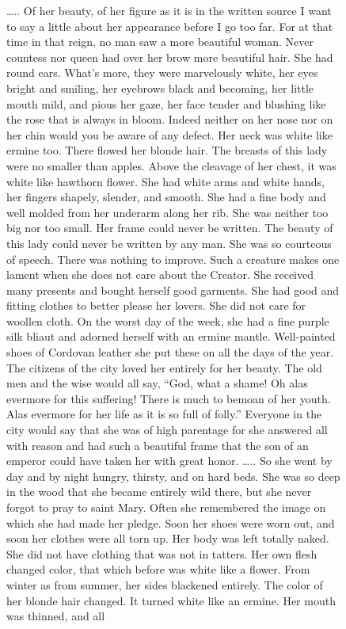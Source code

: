 \documentclass[
  letterpaper,
  DIV=11,
  numbers=noendperiod,
  oneside]{scrreprt}
\begin{document}
\begin{figure}
\ldots.. Of her beauty, of her figure as it is in the written source I
want to say a little about her appearance before I go too far. For at
that time in that reign, no man saw a more beautiful woman. Never
countess nor queen had over her brow more beautiful hair. She had round
ears. What's more, they were marvelously white, her eyes bright and
smiling, her eyebrows black and becoming, her little mouth mild, and
pious her gaze, her face tender and blushing like the rose that is
always in bloom. Indeed neither on her nose nor on her chin would you be
aware of any defect. Her neck was white like ermine too. There flowed
her blonde hair. The breasts of this lady were no smaller than apples.
Above the cleavage of her chest, it was white like hawthorn flower. She
had white arms and white hands, her fingers shapely, slender, and
smooth. She had a fine body and well molded from her underarm along her
rib. She was neither too big nor too small. Her frame could never be
written. The beauty of this lady could never be written by any man. She
was so courteous of speech. There was nothing to improve. Such a
creature makes one lament when she does not care about the Creator. She
received many presents and bought herself good garments. She had good
and fitting clothes to better please her lovers. She did not care for
woollen cloth. On the worst day of the week, she had a fine purple silk
bliaut and adorned herself with an ermine mantle. Well-painted shoes of
Cordovan leather she put these on all the days of the year. The citizens
of the city loved her entirely for her beauty. The old men and the wise
would all say, ``God, what a shame! Oh alas evermore for this suffering!
There is much to bemoan of her youth. Alas evermore for her life as it
is so full of folly.'' Everyone in the city would say that she was of
high parentage for she answered all with reason and had such a beautiful
frame that the son of an emperor could have taken her with great honor.
\ldots.. So she went by day and by night hungry, thirsty, and on hard
beds. She was so deep in the wood that she became entirely wild there,
but she never forgot to pray to saint Mary. Often she remembered the
image on which she had made her pledge. Soon her shoes were worn out,
and soon her clothes were all torn up. Her body was left totally naked.
She did not have clothing that was not in tatters. Her own flesh changed
color, that which before was white like a flower. From winter as from
summer, her sides blackened entirely. The color of her blonde hair
changed. It turned white like an ermine. Her mouth was thinned, and all

\end{figure}
\end{document}
